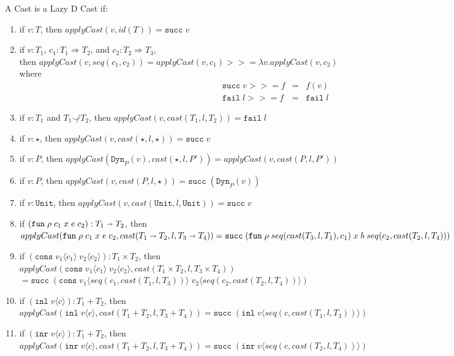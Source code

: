 \documentclass[acmsmall,review,anonymous]{acmart}\settopmatter{printfolios=true,printccs=false,printacmref=false}
\newcommand{\plus}[0]{+}
\newcommand{\judgeType}[2]{#1 : #2}
\newcommand{\judgeTypeFT}[3]{#1 : #2 \Longrightarrow #3} %
\newcommand{\TOOdyn}[0]{\star}
\newcommand{\POOunit}[0]{\mathtt{Unit}}
\newcommand{\POOfun}[2]{#1 \shortrightarrow #2}
\newcommand{\POOprod}[2]{#1 \times #2}
\newcommand{\POOsum}[2]{#1 \plus #2}
\newcommand{\rOOsucc}[1]{\mathtt{succ}\;#1}
\newcommand{\rOOfail}[1]{\mathtt{fail}\;#1}
\newcommand{\hcvOOinj}[2]{\mathtt{Dyn}_{#1}(#2)}
\newcommand{\hcvOOfun}[5]{\mathtt{fun} \; #2 \; #1 \; #3 \; #4 \; #5}
\newcommand{\hcvOOcons}[4]{\mathtt{cons}\;#1\langle#2\rangle\;#3\langle#4\rangle}
\newcommand{\hcvOOinl}[2]{\mathtt{inl}\;#1\langle#2\rangle}
\newcommand{\hcvOOinr}[2]{\mathtt{inr}\;#1\langle#2\rangle}
\begin{document}
\begin{definition}
  \label{def:surely-lazyd}
  A  Cast is a Lazy D Cast if:
  \begin{enumerate}
  \item if $v : T$, then $applyCast(v,id(T)) = \mathtt{succ} \; v $
  \item if $\judgeType{v}{T_1}$,
    $ \judgeTypeFT{c_1}{T_1}{T_2}$, and
    $ \judgeTypeFT{c_2}{T_2}{T_3}$,\\
    then $applyCast(v,seq(c_1,c_2)) = 
    applyCast(v,c_1) >>= \lambda v.applyCast(v,c_2)$\\
    where 
    \[
    \begin{array}{rcl}
      \rOOsucc{v} >>= f & = & f(v) \\
      \rOOfail{l} >>= f & = & \rOOfail{l}
    \end{array}
    \]
  \item if $v : T_1$ and $T_1 \not\smile T_2$,
    then $applyCast(v,cast(T_1, l, T_2)) = \rOOfail{l} $
  \item if $v : \star$, 
    then $applyCast(v,cast(\TOOdyn,l,\TOOdyn)) = \rOOsucc{v} $
  \item if $v : P$,
    then $applyCast(\hcvOOinj{P}{v},cast(\star,l,P')) 
    = applyCast(v,cast(P,l,P')) $
  \item if $v : P$,
    then $applyCast(v,cast(P,l,\star)) = \rOOsucc{(\hcvOOinj{P}{v})} $
  \item if $v : \POOunit$,
    then $applyCast(v,cast(\POOunit,l,\POOunit)) = \rOOsucc{v} $
  \item if $(\hcvOOfun{c_1}{\rho}{x}{e}{c_2}) : \POOfun{T_1}{T_2}$,
    then\\
    $ 
    applyCast(\hcvOOfun{c_1}{\rho}{x}{e}{c_2}, 
    cast(\POOfun{T_1}{T_2},l,\POOfun{T_3}{T_4})) \\
    = 
    \rOOsucc{(\hcvOOfun{seq(cast(T_3,l,T_1),c_1)}{\rho}{x}{b}{seq(c_2,cast(T_2,l,T_4))})}$
  \item if $(\hcvOOcons{v_1}{c_1}{v_2}{c_2}) : \POOprod{T_1}{T_2}$,
    then \\
    $ 
    applyCast(\hcvOOcons{v_1}{c_1}{v_2}{c_2},cast(\POOprod{T_1}{T_2},l,T_3 
    \times 
    T_4))$\\
    $ = 
    \rOOsucc{(\hcvOOcons{v_1}{seq(c_1,cast(T_1,l,T_3))}{v_2}{seq(c_2,cast(T_2,l,T_4))})}
    $ 
  \item if $(\hcvOOinl{v}{c}) : \POOsum{T_1}{T_2}$,
    then \\
    $ 
    applyCast(\hcvOOinl{v}{c},cast(\POOsum{T_1}{T_2},l,\POOsum{T_3}{T_4}))
    = \rOOsucc{(\hcvOOinl{v}{seq(c,cast(T_1,l,T_3))})} $
  \item if $(\hcvOOinr{v}{c}) : \POOsum{T_1}{T_2}$,
    then \\$
    applyCast(\hcvOOinr{v}{c},cast(\POOsum{T_1}{T_2},l,\POOsum{T_3}{T_4}))
    = \rOOsucc{(\hcvOOinr{v}{seq(c,cast(T_2,l,T_4))})} $
  \end{enumerate}
\end{definition}
\end{document}
